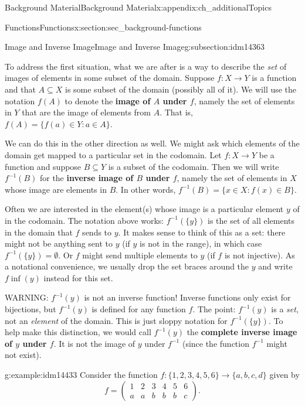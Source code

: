 \documentclass[oneside,10pt,]{book}
\newcommand{\terminology}[1]{\textbf{#1}}
\numberwithin{equation}{chapter}
\def\inv{^{-1}}
\def\st{:}
\newcommand{\amp}{&}
\begin{document}
\begin{appendixptx}{Background Material}{}{Background Material}{}{}{x:appendix:ch_additionalTopics}
\begin{sectionptx}{Functions}{}{Functions}{}{}{x:section:sec_background-functions}
\begin{subsectionptx}{Image and Inverse Image}{}{Image and Inverse Image}{}{}{g:subsection:idm14363}
\par
To address the first situation, what we are after is a way to describe the \emph{set} of images of elements in some subset of the domain.  Suppose \(f:X \to Y\) is a function and that \(A \subseteq X\) is some subset of the domain (possibly all of it).  We will use the notation \(f(A)\) to denote the \terminology{image of \(A\) under \(f\)}, namely the set of elements in \(Y\) that are the image of elements from \(A\).  That is, \(f(A) = \{f(a) \in Y \st a \in A\}\). \label{g:notation:idm14385}%
\par
We can do this in the other direction as well.  We might ask which elements of the domain get mapped to a particular set in the codomain.  Let \(f:X \to Y\) be a function and suppose \(B \subseteq Y\) is a subset of the codomain.  Then we will write \(f\inv(B)\) for the \terminology{inverse image of \(B\) under \(f\)}, namely the set of elements in \(X\) whose image are elements in \(B\).  In other words, \(f\inv(B) = \{x \in X \st f(x) \in B\}\). \label{g:notation:idm14400}%
\par
Often we are interested in the element(s) whose image is a particular element \(y\) of in the codomain.  The notation above works: \(f\inv(\{y\})\) is the set of all elements in the domain that \(f\) sends to \(y\).  It makes sense to think of this as a set: there might not be anything sent to \(y\) (if \(y\) is not in the range), in which case \(f\inv(\{y\}) = \emptyset\).  Or \(f\) might send multiple elements to \(y\) (if \(f\) is not injective).  As a notational convenience, we usually drop the set braces around the \(y\) and write \(f\inf(y)\) instead for this set.%
\par
WARNING: \(f\inv(y)\) is not an inverse function! Inverse functions only exist for bijections, but \(f\inv(y)\) is defined for any function \(f\). The point: \(f\inv(y)\) is a \emph{set}, not an \emph{element} of the domain.  This is just sloppy notation for \(f\inv(\{y\})\).  To help make this distinction, we would call \(f\inv(y)\) the \terminology{complete inverse image of \(y\) under \(f\)}.  It is not the image of \(y\) under \(f\inv\) (since the function \(f\inv\) might not exist).%
\begin{example}{}{g:example:idm14433}%
Consider the function \(f:\{1,2,3,4,5,6\} \to \{a,b,c,d\}\) given by%
\begin{equation*}
f = \begin{pmatrix}1 \amp 2 \amp 3 \amp 4 \amp 5 \amp 6 \\ a \amp a \amp b \amp b \amp b \amp c\end{pmatrix}.

\end{equation*}
\end{example}
\end{subsectionptx}
\end{sectionptx}
\end{appendixptx}
\end{document}
